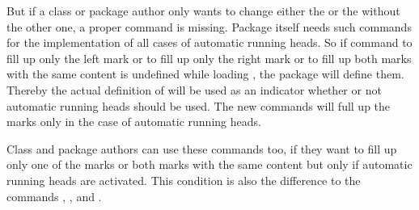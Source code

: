 But if a class or package author only wants to change either the  or the  without the other one, a proper command is
missing. Package  itself needs such commands for the
implementation of all cases of automatic running heads. So if command
 to fill up only the left mark or  to fill up
only the right mark or  to fill up both marks with the same
content is undefined while loading , the package will define
them. Thereby the actual definition of  will be used as an
indicator whether or not automatic running heads should be used. The new
commands will full up the marks only in the case of automatic running heads.

Class and package authors can use these commands too, if they want to fill up
only one of the marks or both marks with the same content but only if
automatic running heads are activated. This condition is also the difference
to the commands , , and .%
\EndIndexGroup
%

\fi %
\fi %

\ifshortversion%
%
\fi

